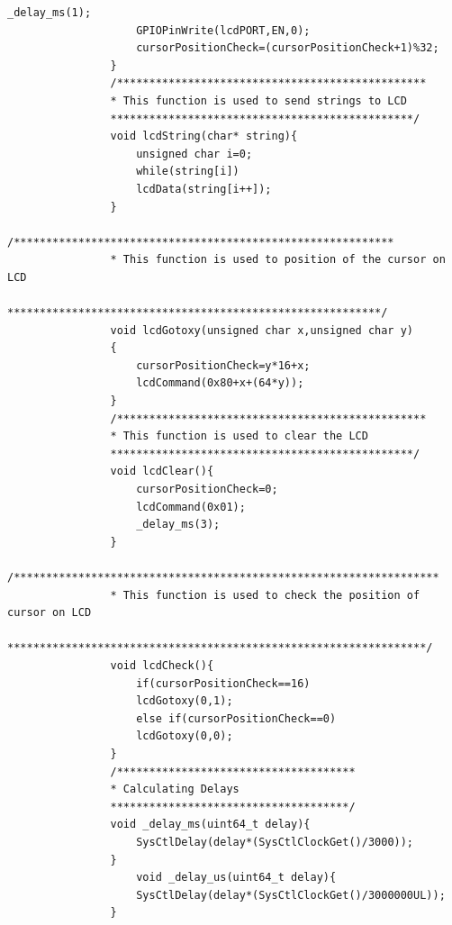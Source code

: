 \documentclass[a4paper,10pt,oneside]{article}
\begin{document}
\begin{lstlisting}[style=CStyle]
					_delay_ms(1);
					GPIOPinWrite(lcdPORT,EN,0);
					cursorPositionCheck=(cursorPositionCheck+1)%32;
				}
				/************************************************
				* This function is used to send strings to LCD
				***********************************************/
				void lcdString(char* string){
					unsigned char i=0;
					while(string[i])
					lcdData(string[i++]);
				}
				/***********************************************************
				* This function is used to position of the cursor on LCD
				**********************************************************/
				void lcdGotoxy(unsigned char x,unsigned char y)
				{
					cursorPositionCheck=y*16+x;
					lcdCommand(0x80+x+(64*y));
				}
				/************************************************
				* This function is used to clear the LCD
				***********************************************/
				void lcdClear(){
					cursorPositionCheck=0;
					lcdCommand(0x01);
					_delay_ms(3);
				}
				/******************************************************************
				* This function is used to check the position of cursor on LCD
				*****************************************************************/
				void lcdCheck(){
					if(cursorPositionCheck==16)
					lcdGotoxy(0,1);
					else if(cursorPositionCheck==0)
					lcdGotoxy(0,0);
				}
				/*************************************
				* Calculating Delays
				*************************************/
				void _delay_ms(uint64_t delay){
					SysCtlDelay(delay*(SysCtlClockGet()/3000));
				}
					void _delay_us(uint64_t delay){
					SysCtlDelay(delay*(SysCtlClockGet()/3000000UL));
				}
			\end{lstlisting}
\end{document}

